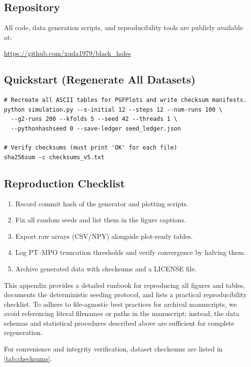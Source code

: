 \documentclass[aps,prd,preprint,onecolumn,superscriptaddress,nofootinbib,longbibliography,floatfix,11pt,showpacs,showkeys]{revtex4-2}
\theoremstyle{plain}
\theoremstyle{definition}
\theoremstyle{remark}
\begin{document}
\subsection{Repository}
All code, data generation scripts, and reproducibility tools are publicly available at:
\begin{center}
\url{https://github.com/xuda1979/black_holes}
\end{center}

\subsection{Quickstart (Regenerate All Datasets)}
\begin{verbatim}
# Recreate all ASCII tables for PGFPlots and write checksum manifests.
python simulation.py --s-initial 12 --steps 12 --num-runs 100 \
  --g2-runs 200 --kfolds 5 --seed 42 --threads 1 \
  --pythonhashseed 0 --save-ledger seed_ledger.json

# Verify checksums (must print 'OK' for each file)
sha256sum -c checksums_v5.txt
\end{verbatim}

\subsection{Reproduction Checklist}
\begin{enumerate}[label=(\alph*)]
  \item Record commit hash of the generator and plotting scripts.
  \item Fix all random seeds and list them in the figure captions.
  \item Export raw arrays (CSV/NPY) alongside plot-ready tables.
  \item Log PT--MPO truncation thresholds and verify convergence by halving them.
  \item Archive generated data with checksums and a LICENSE file.
\end{enumerate}

This appendix provides a detailed runbook for reproducing all figures and tables, documents the deterministic seeding protocol, and lists a practical reproducibility checklist. To adhere to file-agnostic best practices for archival manuscripts, we avoid referencing literal filenames or paths in the manuscript; instead, the data schemas and statistical procedures described above are sufficient for complete regeneration.

For convenience and integrity verification, dataset checksums are listed in \cref{tab:checksums}.
\end{document}
